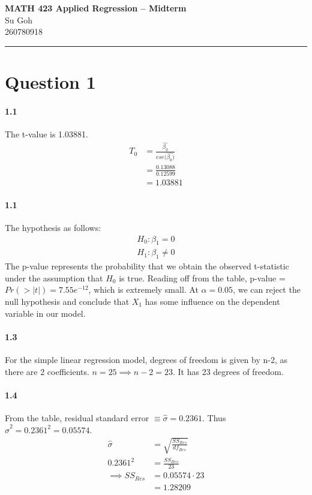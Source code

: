 \documentclass[11pt,letterpaper]{article}
\newcommand{\assignmenttitle}{Midterm}
\newcommand{\course}{MATH 423 Applied Regression}
\newcommand{\studentid}{Su Goh \\ 260780918}
\begin{document}
	
	\noindent
	\large \textbf{\course { -- } \assignmenttitle} \\
	\studentid \\
	\noindent\rule{\textwidth}{0.4pt}
	
	\section*{Question 1}
		\paragraph*{1.1} The t-value is 1.03881.
		\begin{align*}
		T_0 &= \frac{\hat{\beta_0}}{ese(\hat{\beta_0)}} \\ 
			&= \frac{0.13088}{0.12599} \\ 
			&= 1.03881
		\end{align*}
		
		\paragraph*{1.1} The hypothesis as follows: 
		\begin{align*}
			H_0 : \beta_1 = 0 \\
			H_1: \beta_1 \neq 0
		\end{align*}
		The p-value represents the probability that we obtain the observed t-statistic under the assumption that \(H_0\) is true. Reading off from the table, p-value = \(Pr(>|t|) = 7.55e^{-12}\), which is extremely small. At \(\alpha = 0.05\), we can reject the null hypothesis and conclude that \(X_1\) has some influence on the dependent variable in our model. 
		
		\paragraph*{1.3} For the simple linear regression model, degrees of freedom is given by n-2, as there are 2 coefficients. \(n = 25 \implies n-2 = 23\). It has 23 degrees of freedom. 
		
		\paragraph*{1.4} From the table, residual standard error \(\equiv \hat{\sigma} = 0.2361\). Thus \(\hat{\sigma}^2 = 0.2361^2 = 0.05574\).
		\begin{align*}
			\hat{\sigma} &= \sqrt{\frac{SS_{Res}}{df_{Res}}} \\
			0.2361^2 &= \frac{SS_{Res}}{23} \\ 
			\implies SS_{Res} &= 0.05574 \cdot 23 \\
				&= 1.28209	
		\end{align*}
	
\end{document}
